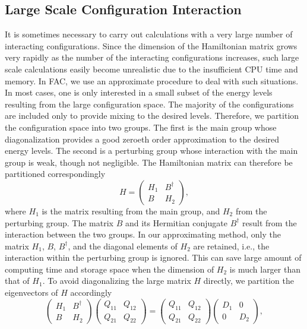 \documentclass{elsart}
\begin{document}
\subsection{Large Scale Configuration Interaction}
It is sometimes necessary to carry out calculations with a very large number of
interacting configurations. Since the dimension of the Hamiltonian matrix
grows very rapidly as the number of the interacting configurations
increases, such large
scale calculations easily become unrealistic due to the insufficient CPU time
and memory. In FAC, we use an approximate procedure to deal with such
situations. In most cases, one is only interested in a small subset of the
energy levels resulting from the large configuration space. The
majority of the configurations are included only to provide mixing to the
desired levels. Therefore, we partition the configuration space into two
groups. The first is the main group whose diagonalization provides a good
zeroeth order approximation to the desired energy levels. The second is a
perturbing group whose interaction with the main group is weak, though not
negligible. The Hamiltonian matrix can therefore be partitioned
correspondingly
\begin{equation}
H = \left(\begin{array}{cc}H_1 & B^{\dagger}\\B & H_2\end{array}\right),
\end{equation}
where $H_1$ is the matrix resulting from the main group, and $H_2$ from the
perturbing group. The matrix $B$ and its Hermitian conjugate $B^{\dagger}$
result from the interaction between the two groups. In our approximating
method, only 
the matrix $H_1$, $B$, $B^{\dagger}$, and the diagonal elements of $H_2$ are
retained, i.e., the interaction within the perturbing group is ignored. This
can save large amount of computing time and storage space when the dimension of
$H_2$ is much larger than that of $H_1$. To avoid diagonalizing the large
matrix $H$ directly, we partition the eigenvectors of $H$ accordingly
\begin{equation}
\left(\begin{array}{cc}H_1 & B^{\dagger} \\ B & H_2\end{array}\right) 
\left(\begin{array}{cc}Q_{11} & Q_{12} \\ Q_{21} & Q_{22} \end{array}\right) 
= \left(\begin{array}{cc}Q_{11} & Q_{12} \\ Q_{21} & Q_{22} \end{array}\right)
\left(\begin{array}{cc} D_1 & 0 \\ 0 & D_2 \end{array}\right),
\end{equation}
\end{document}
